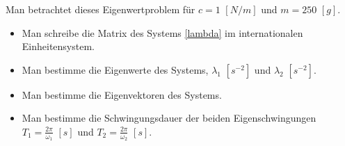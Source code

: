 {Man betrachtet dieses Eigenwertproblem für $c=1\,\, [N/m]$ und $m=250\,\, [g]$.
\begin{itemize}
\item Man schreibe die Matrix des Systems \eqref{lambda} im internationalen Einheitensystem.
\item Man bestimme die Eigenwerte des Systems, $\lambda_1\,\, [s^{-2}]$ und $\lambda_2\,\, [s^{-2}]$.
\item Man bestimme die Eigenvektoren des Systems.
\item Man bestimme die Schwingungsdauer der beiden Eigenschwingungen $T_1 = \frac{2\pi}{\omega_1}\,\, [s]$ und $T_2 = \frac{2\pi}{\omega_2}\,\,[s]$.
\end{itemize}
}

